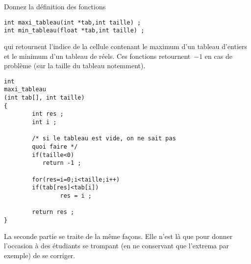 Donnez la d\'efinition des  fonctions 
\begin{verbatim}
int maxi_tableau(int *tab,int taille) ;
int min_tableau(float *tab,int taille) ;
\end{verbatim}
qui retournent l'indice de la cellule contenant le maximum d'un
tableau d'entiers et le minimum d'un tableau de r\'eels.
Ces fonctions retournent~$-1$ en cas de probl\`eme (sur la taille du tableau notemment).
\ifcorrection
\begin{correction}
\begin{verbatim}
int 
maxi_tableau
(int tab[], int taille)
{
        int res ;
        int i ;
        
        /* si le tableau est vide, on ne sait pas 
        quoi faire */
        if(taille<0)
           return -1 ;

        for(res=i=0;i<taille;i++)
        if(tab[res]<tab[i])
                res = i ;

        return res ;
}
\end{verbatim}
La seconde partie se traite de la m\^eme fa\c{c}ons. Elle n'est l\`a que pour
donner l'occasion \`a des \'etudiants se trompant (en ne conservant que l'extrema par exemple) de se corriger.
\end{correction}
\fi

